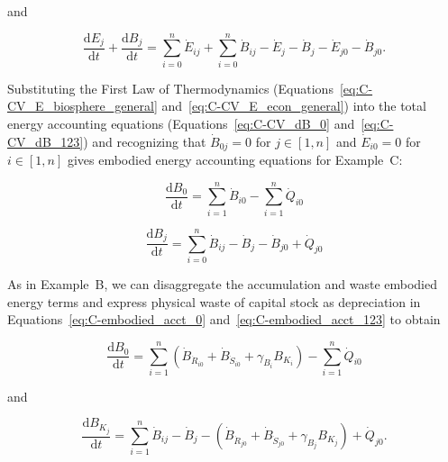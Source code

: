\noindent and

\begin{equation} \label{eq:C-CV_dB_123}
	\frac{\mathrm{d}E_{j}}{\mathrm{d}t}
	+ \frac{\mathrm{d}B_{j}}{\mathrm{d}t} 	 
	= \sum\limits_{i=0}^{n} \dot{E}_{ij}
	+ \sum\limits_{i=0}^{n} \dot{B}_{ij}
	- \dot{E}_{j}
	- \dot{B}_{j}
	- \dot{E}_{j0}
	- \dot{B}_{j0}.
\end{equation}

Substituting the First Law of Thermodynamics
(Equations~\ref{eq:C-CV_E_biosphere_general} and~\ref{eq:C-CV_E_econ_general}) 
into the total energy accounting equations 
(Equations~\ref{eq:C-CV_dB_0} and~\ref{eq:C-CV_dB_123}) 
and recognizing that $\dot{B}_{0j} = 0$ for $j \in [1, n]$
and $\dot{E}_{i0} = 0$ for $i \in [1, n]$
gives embodied energy accounting equations for Example~C: %

\begin{equation} \label{eq:C-embodied_acct_0}
	\frac{\mathrm{d}B_{0}}{\mathrm{d}t} 	 
	= \sum\limits_{i=1}^{n} \dot{B}_{i0}
	- \sum\limits_{i=1}^{n} \dot{Q}_{i0}
\end{equation}

\begin{equation} \label{eq:C-embodied_acct_123}
	\frac{\mathrm{d}B_{j}}{\mathrm{d}t} 	 
	= \sum\limits_{i=0}^{n} \dot{B}_{ij}
	- \dot{B}_{j}
	- \dot{B}_{j0}
	+ \dot{Q}_{j0} 
\end{equation}

As in Example~B, 
we can disaggregate the accumulation and waste embodied energy terms 
and express physical waste of capital stock as depreciation 
in Equations~\ref{eq:C-embodied_acct_0}
and~\ref{eq:C-embodied_acct_123}
to obtain

\begin{equation} \label{eq:C_embodied_energy_accounting_0_with_depreciation}
	\frac{\mathrm{d}B_{0}}{\mathrm{d}t} 
	= \sum\limits_{i=1}^n 
		\left( \dot{B}_{\dot{R}_{i0}} 
				+ \dot{B}_{\dot{S}_{i0}} 
				+ \gamma_{B_{i}} B_{K_{i}} \right)
	- \sum\limits_{i=1}^n\dot{Q}_{i0} 
\end{equation}

\noindent and

\begin{equation} \label{eq:C_embodied_energy_accounting_123_with_depreciation}
	\frac{\mathrm{d}B_{K_{j}}}{\mathrm{d}t} 
	= \sum\limits_{i=1}^n\dot{B}_{ij} 
	- \dot{B}_{j}
	- \left( \dot{B}_{\dot{R}_{j0}}
		+ \dot{B}_{\dot{S}_{j0}}
		+ \gamma_{B_{j}} B_{K_{j}} \right)
	+ \dot{Q}_{j0}.
\end{equation}

